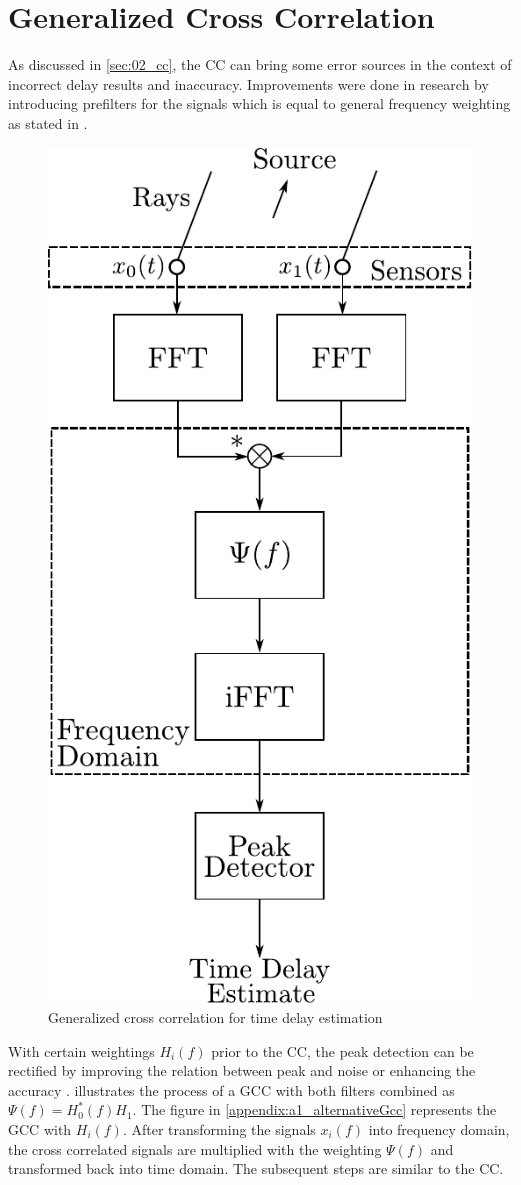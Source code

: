\section{Generalized Cross Correlation}
\label{sec:02_gcc}

As discussed in \cref{sec:02_cc}, the \ac{CC} can bring some error sources in the context of
incorrect delay results and inaccuracy.
Improvements were done in research by introducing prefilters for the signals
which is equal to general frequency weighting as stated in \cite{K_C_GCC}.
\begin{figure}[ht]
	\centering
		\includegraphics[width=0.35\columnwidth]{figures/GCC_weight}
	\caption{Generalized cross correlation for time delay estimation}
    \label{fig:02_GCC}
\end{figure}
With certain weightings $H_i(f)$ prior to the \ac{CC}, the peak detection
can be rectified by improving the relation between peak and noise or
enhancing the accuracy \cite{H_B_GCC}.
 illustrates the process of a \ac{GCC} with both filters combined as
$\Psi(f) = H_0^*(f)H_1$. The figure in \cref{appendix:a1_alternativeGcc} represents the
\ac{GCC} with $H_i(f)$.
After transforming the signals $x_i(f)$ into frequency domain, the cross correlated
signals are multiplied with the weighting $\Psi(f)$ and transformed back into time domain.
The subsequent steps are similar to the \ac{CC}.

